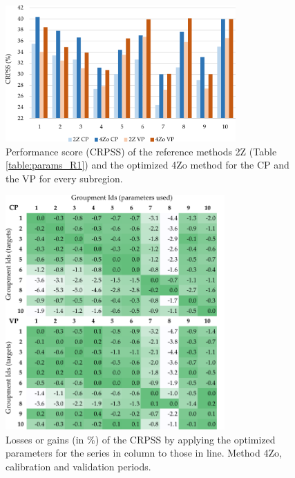\documentclass[review]{elsarticle}
\begin{document}
\begin{figure}[t]
	\centerline{\includegraphics[width=8.8cm]{figures/fig04.pdf}}
	\caption{Performance score (CRPSS) of the reference methods 2Z (Table \ref{table:params_R1}) and the optimized 4Zo method for the CP and the VP for every subregion.}
	\label{fig:figure_crpss_4Zo}
\end{figure}

\begin{figure}[t]
	\centerline{\includegraphics[width=8.4cm]{figures/fig05.pdf}}
	\caption{Losses or gains (in \%) of the CRPSS by applying the optimized parameters for the series in column to those in line. Method 4Zo, calibration and validation periods.}
	\label{fig:crossing_4Zo}
\end{figure}
\end{document}
